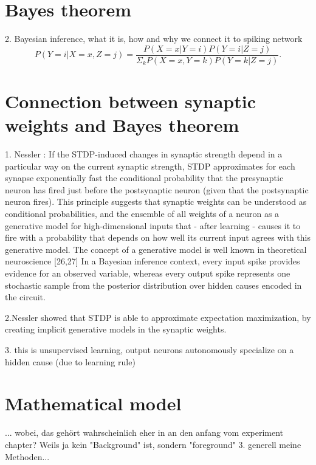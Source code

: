 \section{Bayes theorem}

2. Bayesian inference, what it is, how and why we connect it to spiking network
\begin{equation}
\label{eqn:pYvorausgesetztXUndZ}
P(Y = i|X = x, Z = j) = \frac{P(X=x|Y=i)P(Y = i|Z = j)}{\Sigma_{k}P(X=x,Y=k)P(Y=k|Z=j)}.
\end{equation}

\section{Connection between synaptic weights and Bayes theorem}

1. Nessler : If the STDP-induced changes in
synaptic strength depend in a particular way on the current
synaptic strength, STDP approximates for each synapse exponentially fast the conditional probability that the presynaptic neuron
has fired just before the postsynaptic neuron (given that the
postsynaptic neuron fires). This principle suggests that synaptic
weights can be understood as conditional probabilities, and the
ensemble of all weights of a neuron as a generative model for high-dimensional inputs that - after learning - causes it to fire with a
probability that depends on how well its current input agrees with
this generative model. The concept of a generative model is well
known in theoretical neuroscience [26,27]
 In a Bayesian inference context, every input
spike provides evidence for an observed variable, whereas every
output spike represents one stochastic sample from the posterior
distribution over hidden causes encoded in the circuit.

2.Nessler showed that STDP is able to approximate expectation maximization, by creating implicit generative models in the synaptic weights.

3. this is unsupervised learning, output neurons autonomously specialize on a hidden cause (due to learning rule)

\section{Mathematical model}

... wobei, das gehört wahrscheinlich eher in an den anfang vom experiment chapter? Weils ja kein "Background" ist, sondern "foreground"
3. generell meine Methoden...